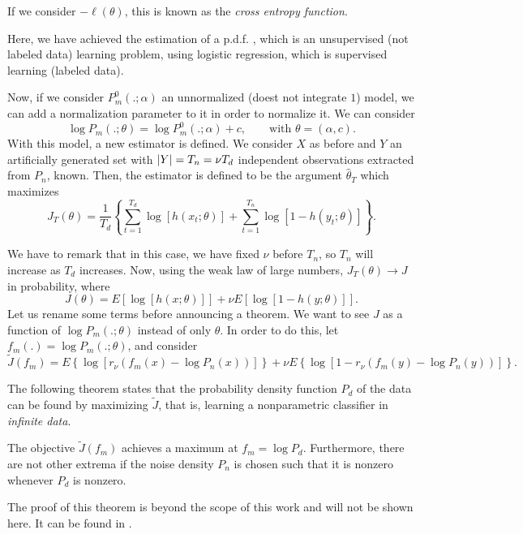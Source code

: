 \begin{remark}
If we consider $-\ell(\theta)$, this is known as the \emph{cross entropy function}.
\end{remark}

\begin{remark}
    Here, we have achieved the estimation of a p.d.f. , which is an unsupervised (not labeled data) learning problem, using logistic regression, which is supervised learning (labeled data).
\end{remark}

Now, if we consider $P_m^0(.;\alpha)$ an unnormalized (doest not integrate $1$) model, we can add a normalization parameter to it in order to normalize it. We can consider
\[
\log P_m(.;\theta) = \log P_m^0(.;\alpha ) + c  , \quad \quad \text{with } \theta=(\alpha,c).
\]
With this model, a new estimator is defined. We consider $X$ as before and $Y$ an artificially generated set with $\left\lvert Y\right\rvert = T_n = \nu T_d$ independent observations extracted from $P_n$, known. Then, the estimator is defined to be the  argument $\hat{\theta}_T$ which maximizes
\[
J_T(\theta) = \frac{1}{T_d}\left\{\sum_{t = 1}^{T_d} \log[h(x_t;\theta)] + \sum_{t=1}^{T_n}\log[1-h(y_t;\theta)]\right\}.
\]

We have to remark that in this case, we have fixed $\nu$ before $T_n$, so $T_n$ will increase as $T_d$ increases. Now, using the weak law of large numbers, $J_T(\theta) \to J$ in probability, where
\[
J(\theta) = E\left[\log[h(x;\theta)]\right] + \nu E\left[\log[1-h(y;\theta)]\right].
\]
Let us rename some terms before announcing a theorem. We want to see $J$ as a function of $\log P_m(.;\theta)$ instead of only $\theta$. In order to do this, let $f_m(.) = \log P_m(.;\theta)$, and consider
\[
\tilde{J}(f_m) = E\left\{\log[r_\nu (f_m(x) - \log P_n(x))]\right\} + \nu E\left\{\log [1- r_\nu(f_m(y) - \log P_n(y))]\right\}.    
\]

The following theorem states that the probability density function $P_d$ of the data can be found by maximizing $\tilde{J}$, that is, learning a nonparametric classifier in \emph{infinite data}.

\begin{nthC}
The objective $\tilde{J}(f_m)$ achieves a maximum at $f_m = \log P_d$. Furthermore, there are not other extrema if the noise density $P_n$ is chosen such that it is nonzero whenever $P_d$ is nonzero.
\end{nthC}

The proof of this theorem is beyond the scope of this work and will not be shown here. It can be found in \cite{gutmann_noise-contrastive_nodate}.